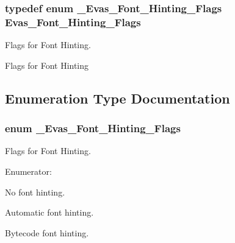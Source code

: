 \subsubsection[{Evas\_\-Font\_\-Hinting\_\-Flags}]{\setlength{\rightskip}{0pt plus 5cm}typedef enum {\bf \_\-Evas\_\-Font\_\-Hinting\_\-Flags}  {\bf Evas\_\-Font\_\-Hinting\_\-Flags}}\label{group__Evas__Font__Group_gaaed9273c1705a3d2356470c60b2f5aa5}


Flags for Font Hinting. 

Flags for Font Hinting 

\subsection{Enumeration Type Documentation}
\subsubsection[{\_\-Evas\_\-Font\_\-Hinting\_\-Flags}]{\setlength{\rightskip}{0pt plus 5cm}enum {\bf \_\-Evas\_\-Font\_\-Hinting\_\-Flags}}\label{group__Evas__Font__Group_ga49208864211c97ac1a09f03318aa253c}


Flags for Font Hinting. 

\begin{Desc}
\item[Enumerator: ]\par
\begin{description}
\item[{\em 
EVAS\_\-FONT\_\-HINTING\_\-NONE\label{group__Evas__Font__Group_gga49208864211c97ac1a09f03318aa253cabe20aa1c68be79f42ccfda9bc930c338}
}]No font hinting. \item[{\em 
EVAS\_\-FONT\_\-HINTING\_\-AUTO\label{group__Evas__Font__Group_gga49208864211c97ac1a09f03318aa253cac056b6ea8f7ad771b406e217e34b8440}
}]Automatic font hinting. \item[{\em 
EVAS\_\-FONT\_\-HINTING\_\-BYTECODE\label{group__Evas__Font__Group_gga49208864211c97ac1a09f03318aa253ca4731c09040a5e13aee4242483cc5a61e}
}]Bytecode font hinting. \end{description}
\end{Desc}



